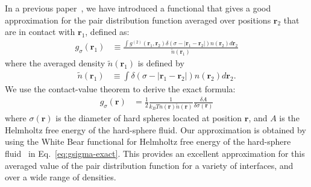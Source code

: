 \documentclass[letterpaper,twocolumn,amsmath,amssymb,pre,aps,10pt]{revtex4-1}
\newcommand{\rr}{\textbf{r}}
\begin{document}
In a previous paper~\cite{schulte2012using}, we have introduced a
functional that gives a good approximation for the pair distribution
function averaged over positions $\rr_2$ that are in contact with
$\rr_1$, defined as:
\begin{align}
  g_\sigma(\rr_1) &\equiv \frac{ \int g^{(2)}(\rr_1,\rr_2) \delta(\sigma -|\rr_1-\rr_2|)n(\rr_2)
    d\rr_2 }{ \tilde{n}(\rr_1)  }
\end{align}
where the averaged density $\tilde{n}(\rr_1)$ is defined by
\begin{align}
  \tilde{n}(\rr_1) &\equiv \int \delta(\sigma -|\rr_1 - \rr_2|)n(\rr_2) d\rr_2.
\end{align}
We use the contact-value theorem to derive the exact formula:
\begin{align}
  g_\sigma(\rr)%
  &= \frac12 \frac{1}{k_BT n(\rr) \tilde{n}(\rr)} \frac{\delta
    A}{\delta \sigma(\mathbf{r})} \label{eq:gsigma-exact}
\end{align}
where $\sigma(\rr)$ is the diameter of hard spheres located at
position $\rr$, and $A$ is the Helmholtz free energy of the
hard-sphere fluid.  Our approximation is obtained by using the White
Bear functional for Helmholtz free energy of the hard-sphere
fluid~\cite{roth2002whitebear} in Eq.~\ref{eq:gsigma-exact}.  This
provides an excellent approximation for this averaged value of the
pair distribution function for a variety of interfaces, and over a
wide range of densities.
\end{document}
